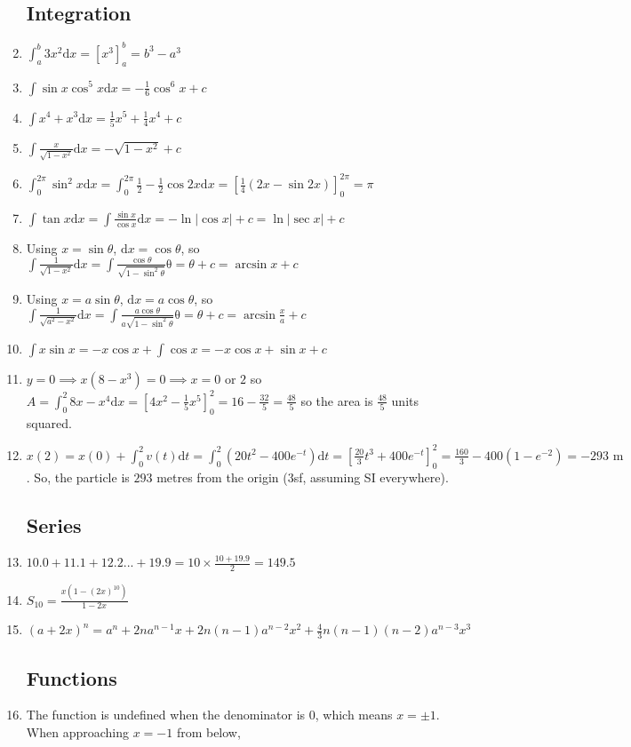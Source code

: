 \documentclass{article}
\begin{document}
\begin{enumerate}
\subsection{Integration}
    \item $\int_{a}^{b} 3x^2 \mathrm{d}x=[x^3]_{a}^{b}=b^3-a^3$
    \item $\int \sin{x} \cos^5{x} \mathrm{d} x= -\frac{1}{6} \cos^6{x} + c$
    \item $\int x^4 + x^3 \mathrm{d} x = \frac{1}{5}x^5 + \frac{1}{4} x^4 + c$
    \item $\int \frac{x}{\sqrt{1-x^2}} \mathrm{d} x=-\sqrt{1-x^2}+c$
    \item $\int_{0}^{2\pi} \sin^2{x} \mathrm{d} x= \int_{0}^{2\pi} \frac{1}{2} - \frac{1}{2}\cos{2x} \mathrm{d} x = [\frac{1}{4}(2x-\sin{2x})]_0^{2\pi}=\pi$
    \item $\int \tan{x} \mathrm{d}x = \int \frac{\sin{x}}{\cos{x}} \mathrm{d} x = -\ln{|\cos{x}|} + c = \ln{|\sec{x}|} + c$
    \item Using $x=\sin{\theta}$, $\mathrm{d} x = \cos{\theta}$, so $\int \frac{1}{\sqrt{1-x^2}} \mathrm{d}x =\int \frac{\cos{\theta}}{\sqrt{1-\sin^2{\theta}}} \mathrm{\theta} = \theta + c = \arcsin{x}+c$
    \item Using $x=a\sin{\theta}$, $\mathrm{d} x = a\cos{\theta}$, so $\int \frac{1}{\sqrt{a^2-x^2}} \mathrm{d}x =\int \frac{a\cos{\theta}}{a\sqrt{1-\sin^2{\theta}}} \mathrm{\theta} = \theta + c = \arcsin{\frac{x}{a}}+c$
    \item $\int x \sin{x} = -x \cos{x} + \int \cos{x} = -x \cos{x} + \sin{x} +c$
    \item $y=0 \implies x(8-x^3)=0 \implies x=0 \text{ or } 2$ so $A=\int_{0}^{2} 8x-x^4 \mathrm{d}x=[4x^2 - \frac{1}{5} x^5]_0^2=16-\frac{32}{5}=\frac{48}{5}$ so the area is $\frac{48}{5}$ units squared.
    \item $x(2)=x(0)+\int_{0}^{2}v(t) \mathrm{d}t = \int_{0}^{2} (20t^2 - 400 e^{-t}) \mathrm{d}t=[\frac{20}{3}t^3+400e^{-t}]_0^2=\frac{160}{3} - 400 (1-e^{-2})= -293 \text{ m}$. So, the particle is $293$ metres from the origin (3sf, assuming SI everywhere).
\subsection{Series}
    \item $10.0 + 11.1 + 12.2 ... + 19.9 = 10 \times \frac{10+19.9}{2}=149.5$
    \item $S_10 = \frac{x(1-(2x)^10)}{1-2x}$
    \item $(a+2x)^n = a^n + 2na^{n-1} x + 2n(n-1) a^{n-2} x^2 + \frac{4}{3} n(n-1)(n-2) a^{n-3} x^3$
\subsection{Functions}
    \item The function is undefined when the denominator is $0$, which means $x=\pm 1$. When approaching $x=-1$ from below, 
\end{enumerate}
\end{document}
